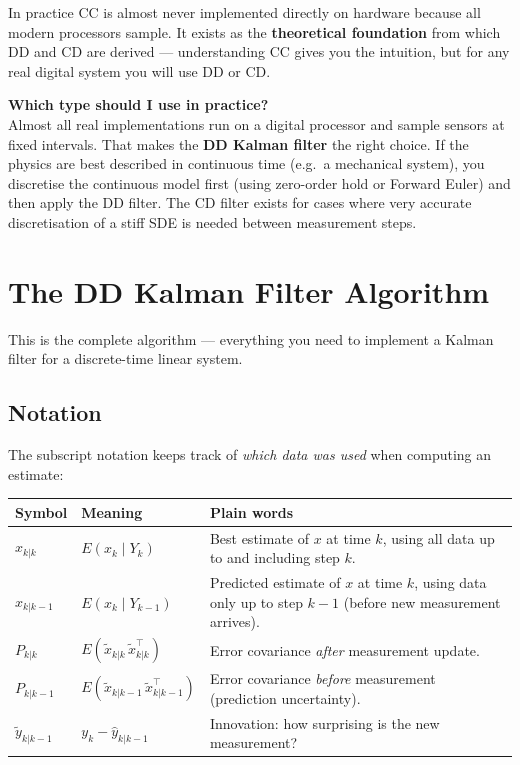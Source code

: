 \documentclass[12pt, a4paper]{article}
\begin{document}
In practice CC is almost never implemented directly on hardware
because all modern processors sample.
It exists as the \textbf{theoretical foundation} from which DD and
CD are derived --- understanding CC gives you the intuition, but
for any real digital system you will use DD or CD.

\begin{notebox}
  \textbf{Which type should I use in practice?}\\
  Almost all real implementations run on a digital processor and
  sample sensors at fixed intervals.
  That makes the \textbf{DD Kalman filter} the right choice.
  If the physics are best described in continuous time (e.g.\ a
  mechanical system), you discretise the continuous model first
  (using zero-order hold or Forward Euler) and then apply the DD
  filter.
  The CD filter exists for cases where very accurate discretisation
  of a stiff SDE is needed between measurement steps.
\end{notebox}

\clearpage
\section*{The DD Kalman Filter Algorithm}

This is the complete algorithm --- everything you need to implement
a Kalman filter for a discrete-time linear system.

\subsection*{Notation}

The subscript notation keeps track of \emph{which data was used}
when computing an estimate:

\begin{center}
\renewcommand{\arraystretch}{1.5}
\begin{tabular}{p{3cm} p{5.5cm} p{5.5cm}}
  \toprule
  \textbf{Symbol} & \textbf{Meaning} & \textbf{Plain words} \\
  \midrule
  $\hat{x}_{k|k}$ &
    $E(x_k \mid Y_k)$ &
    Best estimate of $x$ at time $k$, using all data up to and
    including step $k$. \\
  $\hat{x}_{k|k-1}$ &
    $E(x_k \mid Y_{k-1})$ &
    Predicted estimate of $x$ at time $k$, using data only up to
    step $k{-}1$ (before new measurement arrives). \\
  $P_{k|k}$ &
    $E(\tilde{x}_{k|k}\,\tilde{x}_{k|k}^\top)$ &
    Error covariance \emph{after} measurement update. \\
  $P_{k|k-1}$ &
    $E(\tilde{x}_{k|k-1}\,\tilde{x}_{k|k-1}^\top)$ &
    Error covariance \emph{before} measurement (prediction
    uncertainty). \\
  $\tilde{y}_{k|k-1}$ &
    $y_k - \hat{y}_{k|k-1}$ &
    Innovation: how surprising is the new measurement? \\
  \bottomrule
\end{tabular}
\end{center}
\end{document}
